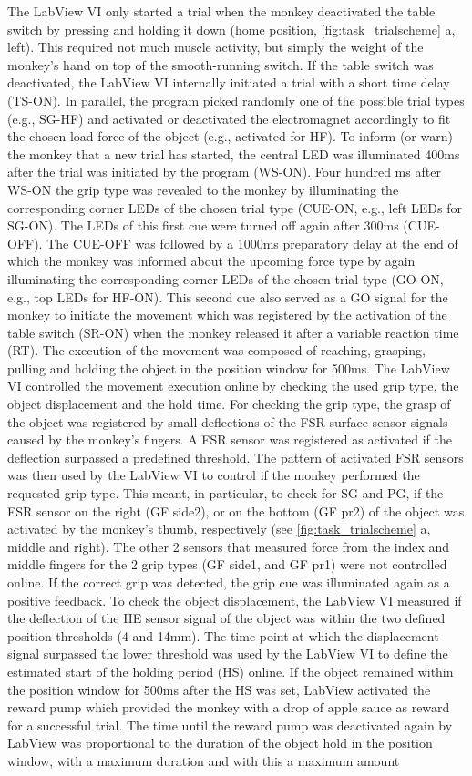 {The LabView VI only started a trial when the monkey deactivated the table switch by pressing and holding it down (home position, \cref{fig:task_trialscheme} a, left). This required not much muscle activity, but simply the weight of the monkey's hand on top of the smooth-running switch. If the table switch was deactivated, the LabView VI internally initiated a trial with a short time delay (TS-ON). In parallel, the program picked randomly one of the possible trial types (e.g., SG-HF) and activated or deactivated the electromagnet accordingly to fit the chosen load force of the object (e.g., activated for HF). To inform (or warn) the monkey that a new trial has started, the central LED was illuminated 400ms after the trial was initiated by the program (WS-ON). Four hundred ms after WS-ON the grip type was revealed to the monkey by illuminating the corresponding corner LEDs of the chosen trial type (CUE-ON, e.g., left LEDs for SG-ON). The LEDs of this first cue were turned off again after 300ms (CUE-OFF). The CUE-OFF was followed by a 1000ms preparatory delay at the end of which the monkey was informed about the upcoming force type by again illuminating the corresponding corner LEDs of the chosen trial type (GO-ON, e.g., top LEDs for HF-ON). This second cue also served as a GO signal for the monkey to initiate the movement which was registered by the activation of the table switch (SR-ON) when the monkey released it after a variable reaction time (RT). The execution of the movement was composed of reaching, grasping, pulling and holding the object in the position window for 500ms. The LabView VI controlled the movement execution online by checking the used grip type, the object displacement and the hold time. For checking the grip type, the grasp of the object was registered by small deflections of the FSR surface sensor signals caused by the monkey's fingers. A FSR sensor was registered as activated if the deflection surpassed a predefined threshold. The pattern of activated FSR sensors was then used by the LabView VI to control if the monkey performed the requested grip type. This meant, in particular, to check for SG and PG, if the FSR sensor on the right (GF side2), or on the bottom (GF pr2) of the object was activated by the monkey's thumb, respectively (see \cref{fig:task_trialscheme} a, middle and right). The other 2 sensors that measured force from the index and middle fingers for the 2 grip types (GF side1, and GF pr1) were not controlled online. If the correct grip was detected, the grip cue was illuminated again as a positive feedback. To check the object displacement, the LabView VI measured if the deflection of the HE sensor signal of the object was within the two defined position thresholds (4 and 14mm). The time point at which the displacement signal surpassed the lower threshold was used by the LabView VI to define the estimated start of the holding period (HS) online. If the object remained within the position window for 500ms after the HS was set, LabView activated the reward pump which provided the monkey with a drop of apple sauce as reward for a successful trial. The time until the reward pump was deactivated again by LabView was proportional to the duration of the object hold in the position window, with a maximum duration and with this a maximum amount }

